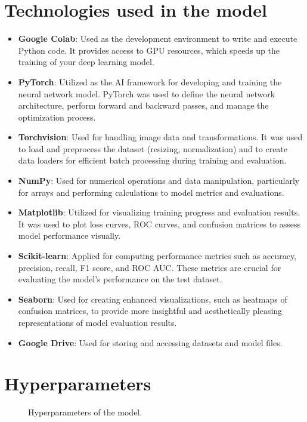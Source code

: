 \documentclass[a4paper,oneside,11pt]{book}
\begin{document}
\section{Technologies used in the model}
\begin{itemize}
    \item \textbf{Google Colab}: Used as the development environment to write and execute Python code. It provides access to GPU resources, which speeds up the training of your deep learning model.
    \item \textbf{PyTorch}: Utilized as the AI framework for developing and training the neural network model. PyTorch was used to define the neural network architecture, perform forward and backward passes, and manage the optimization process.
    \item \textbf{Torchvision}: Used for handling image data and transformations. It was used to load and preprocess the dataset (resizing, normalization) and to create data loaders for efficient batch processing during training and evaluation.
    \item \textbf{NumPy}: Used for numerical operations and data manipulation, particularly for arrays and performing calculations to model metrics and evaluations.
    \item \textbf{Matplotlib}: Utilized for visualizing training progress and evaluation results. It was used to plot loss curves, ROC curves, and confusion matrices to assess model performance visually.
    \item \textbf{Scikit-learn}: Applied for computing performance metrics such as accuracy, precision, recall, F1 score, and ROC AUC. These metrics are crucial for evaluating the model's performance on the test dataset.
    \item \textbf{Seaborn}: Used for creating enhanced visualizations, such as heatmaps of confusion matrices, to provide more insightful and aesthetically pleasing representations of model evaluation results.
    \item \textbf{Google Drive}: Used for storing and accessing datasets and model files.
\end{itemize}
\section{Hyperparameters} 
\begin{figure}[H]
    \centering
    \caption{Hyperparameters of the model.}
\end{figure}
\end{document}
